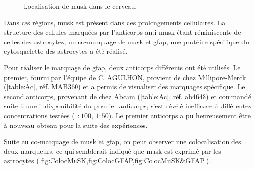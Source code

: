 \begin{figure}[h]
\begin{center}
\begin{subfigure}[h]{0.329\textwidth}
			\end{subfigure}
		\end{center}
		\caption{Localisation de \gls{musk} dans le cerveau.}
		\label{fig:ImmunoMusk}
	\end{figure}
\FloatBarrier
	
	Dans ces régions, \gls{musk} est présent dans des prolongements cellulaires. La structure des cellules marquées par l'anticorps anti-\gls{musk} étant réminiscente de celles des astrocytes, un co-marquage de \gls{musk} et \gls{gfap}, une protéine spécifique du cytosquelette des astrocytes a été réalisé.
	
	Pour réaliser le marquage de \gls{gfap}, deux anticorps différents ont été utilisés. Le premier, fourni par l'équipe de C. AGULHON, provient de chez Millipore-Merck (\cref{table:Ac}, réf. MAB360) et a permis de visualiser des marquages spécifique. Le second anticorps, provenant de chez Abcam (\cref{table:Ac}, réf. ab4648) et commandé suite à une indisponibilité du premier anticorps, s'est révélé inefficace à différentes concentrations testées ($1{:}100$, $1{:}50$). Le premier anticorps a pu heureusement être à nouveau obtenu pour la suite des expériences.
	
	Suite au co-marquage de \gls{musk} et \gls{gfap}, on peut observer une colocalisation des deux marqueurs, ce qui semblerait indiqué que \gls{musk} est exprimé par les astrocytes (\cref{fig:ColocMuSK,fig:ColocGFAP,fig:ColocMuSK&GFAP}).
	
